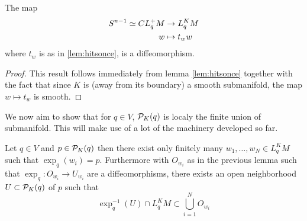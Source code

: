 \begin{corollary}\label{cor:lksn}
    The map 
    \begin{align*}
        {S^{n-1}} \simeq CL^+_qM &\to L^K_qM\\
        w &\mapsto t_ww
    \end{align*}
    where $t_w$ is as in \ref{lem:hitsonce}, is a diffeomorphism.
\end{corollary}
\begin{proof}
    This result follows immediately from lemma \ref{lem:hitsonce} together with the fact that since $K$ is (away from its boundary) a smooth submanifold, the map $w\mapsto t_w$ is smooth.
\end{proof}

We now aim to show that for $q\in V$,  ${\mathcal{P}}_K(q)$ is localy the finite union of submanifold. This will make use of a lot of the machinery developed so far. 
\begin{lemma}\label{lem:finitevecs}
    Let $q\in V$ and $p\in {\mathcal{P}}_K(q)$ then there exist only finitely many $w_1,\dots,w_N\in L^K_qM$ such that $\exp_q(w_i)=p$. Furthermore with $O_{w_i}$ as in the previous lemma such that $\exp_q:O_{w_i}\to U_{w_i}$ are a diffeomorphisms, there exists an open neighborhood $U\subset {\mathcal{P}}_K(q)$ of $p$ such that 
    \[
        \exp^{-1}_{q}(U)\cap L^K_qM \subset \bigcup_{i=1}^N O_{w_i}
    \]
    
\end{lemma}
